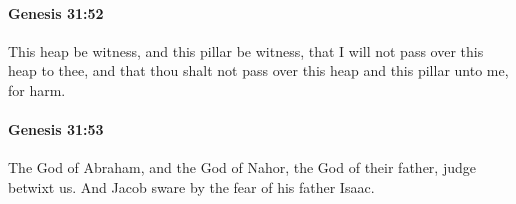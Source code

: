 		\paragraph{Genesis 31:52} %
			\label{GENESIS-31-52}

			This heap be witness, and this pillar be witness, that I will not pass over this heap to thee, and that thou shalt not pass over this heap and this pillar unto me, for harm.


		\paragraph{Genesis 31:53} %
			\label{GENESIS-31-53}

			The God of Abraham, and the God of Nahor, the God of their father, judge betwixt us. And Jacob sware by the fear of his father Isaac.



